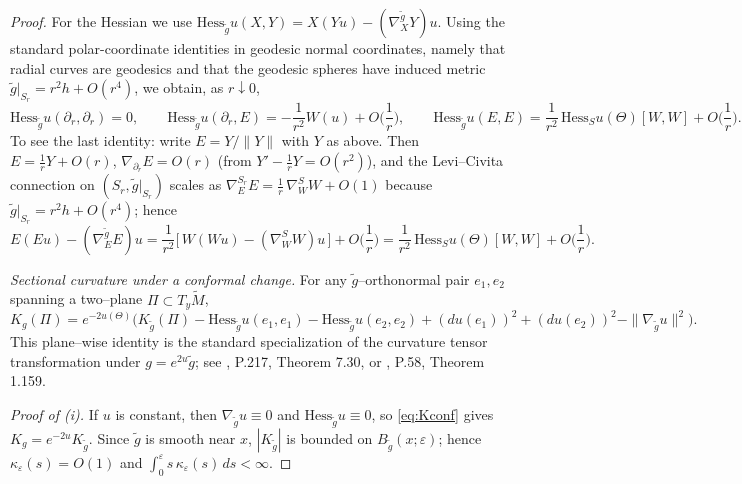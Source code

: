 \documentclass{amsart}
\let\oldcitet\citet
\renewcommand{\citet}[1]{\textcolor{blue}{\oldcitet{#1}}}
\theoremstyle{definition}
\theoremstyle{remark}
\newcommand{\0}{\boldsymbol{0}}
\begin{document}
\begin{proof}
For the Hessian we use $\mathrm{Hess}_{\widetilde g}u(X,Y)=X(Yu)-(\nabla^{\widetilde g}_X Y)u$. 
Using the standard polar-coordinate identities in geodesic normal coordinates, namely that radial curves are geodesics and that the geodesic spheres have induced metric \(\widetilde g|_{S_r}=r^2h+O(r^4)\), we obtain, as $r\downarrow0$,
\begin{equation}\label{eq:Hess-scalings}
\mathrm{Hess}_{\widetilde g}u(\partial_r,\partial_r)=0,\qquad
\mathrm{Hess}_{\widetilde g}u(\partial_r,E)= -\frac{1}{r^2}W(u)+O\!\Big(\frac1r\Big),\qquad
\mathrm{Hess}_{\widetilde g}u(E,E)=\frac{1}{r^2}\,\mathrm{Hess}_S u(\Theta)[W,W]+O\!\Big(\frac1r\Big).
\end{equation}
To see the last identity: write $E=Y/\|Y\|$ with $Y$ as above. 
Then $E=\frac1r Y+O(r)$, $\nabla_{\partial_r}E=O(r)$ (from $Y'-\frac1rY=O(r^2)$), and the Levi–Civita connection on $(S_r,\widetilde g|_{S_r})$ scales as $\nabla^{S_r}_E E = \frac1r\,\nabla^{S}_W W + O(1)$ because $\widetilde g|_{S_r}=r^2 h + O(r^4)$; hence
\[
E(Eu)-(\nabla^{\widetilde g}_E E)u
=\frac1{r^2}\bigl[\,W(Wu)-(\nabla^S_W W)u\,\bigr]+O\!\Big(\frac1r\Big)
=\frac1{r^2}\,\mathrm{Hess}_S u(\Theta)[W,W]+O\!\Big(\frac1r\Big).
\]

\emph{Sectional curvature under a conformal change.}
For any $\widetilde g$–orthonormal pair $e_1,e_2$ spanning a two–plane $\Pi\subset T_y\widetilde M$,
\begin{equation}\label{eq:Kconf}
K_{g}(\Pi)=e^{-2u(\Theta)}\Big(
K_{\widetilde g}(\Pi)
-\mathrm{Hess}_{\widetilde g}u(e_1,e_1)-\mathrm{Hess}_{\widetilde g}u(e_2,e_2)
+(du(e_1))^2+(du(e_2))^2-\|\nabla_{\widetilde g}u\|^2
\Big).
\end{equation}
This plane–wise identity is the standard specialization of the curvature tensor transformation under $g=e^{2u}\widetilde g$; see \citet{lee_introduction_to_RM_2018}, P.217, Theorem 7.30, or \citet{Besse1987}, P.58, Theorem 1.159.

\smallskip
\emph{Proof of (i).}
If $u$ is constant, then $\nabla_{\widetilde g}u\equiv0$ and $\mathrm{Hess}_{\widetilde g}u\equiv0$, so \eqref{eq:Kconf} gives $K_g=e^{-2u}K_{\widetilde g}$. 
Since $\widetilde g$ is smooth near $x$, $|K_{\widetilde g}|$ is bounded on $B_{\widetilde g}(x;\varepsilon)$; hence $\kappa_{\varepsilon}(s)=O(1)$ and $\int_0^\varepsilon s\,\kappa_{\varepsilon}(s)\,ds<\infty$.


\end{proof}
\end{document}
